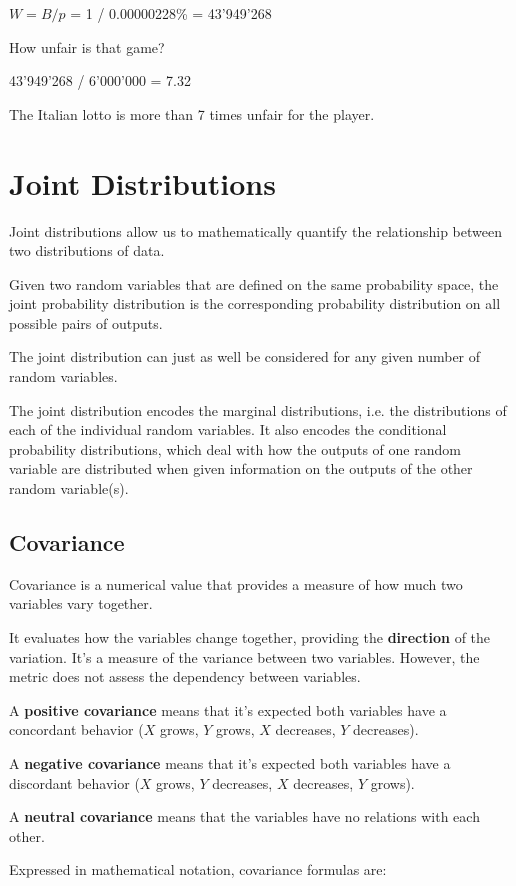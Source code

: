 \documentclass{article}
\begin{document}
$W = B/p$ = 1 / 0.00000228\% = 43’949’268

How unfair is that game?

43’949’268 / 6’000’000 = 7.32

The Italian lotto is more than 7 times unfair for the player.
\clearpage

\section{Joint Distributions}
Joint distributions allow us to mathematically quantify the relationship between two distributions of data. 

Given two random variables that are defined on the same probability space, the joint probability distribution is the corresponding probability distribution on all possible pairs of outputs. 

The joint distribution can just as well be considered for any given number of random variables. 

The joint distribution encodes the marginal distributions, i.e. the distributions of each of the individual random variables. It also encodes the conditional probability distributions, which deal with how the outputs of one random variable are distributed when given information on the outputs of the other random variable(s).

\subsection{Covariance}
Covariance is a numerical value that provides a measure of how much two variables vary together.

It evaluates how the variables change together, providing the \textbf{direction} of the variation. 
It’s a measure of the variance between two variables. However, the metric does not assess the dependency between variables.

A \textbf{positive covariance} means that it’s expected both variables have a concordant behavior ($X$ grows, $Y$ grows, $X$ decreases, $Y$ decreases).

A \textbf{negative covariance} means that it’s expected both variables have a discordant behavior 
($X$ grows, $Y$ decreases, $X$ decreases, $Y$ grows).

A \textbf{neutral covariance} means that the variables have no relations with each other.

Expressed in mathematical notation, covariance formulas are:
\end{document}
